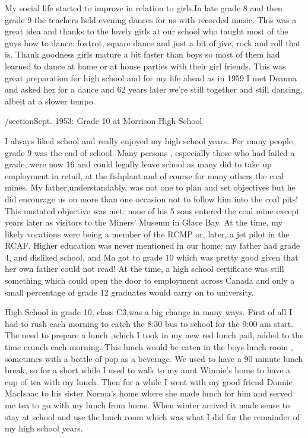 My social life started to improve in relation to girls.In late grade 8 and then grade 9 the teachers held evening dances for us with recorded music. This was a great idea and thanks to the lovely girls at our school who taught most of the guys how to dance: foxtrot, square dance and just a bit of jive, rock and roll that is. Thank goodness girls mature a bit faster than boys so most of them had learned to dance at home or at house parties with their girl friends. This was great preparation for high school and for my life ahead as in 1959 I met Deanna and asked her for a dance and 62 years later we're still together and still dancing, albeit at a slower tempo.

/section{Sept. 1953: Grade 10 at Morrison High School}

I always liked school and really enjoyed my high school years. For many people, grade 9 was the end of school. Many persons , especially those who had failed a grade, were now 16 and could legally leave school as many did to take up employment in retail, at the fishplant and of course for many others the coal mines. My father,understandably, was not one to plan and set objectives but he did encourage us on more than one occasion not to follow him into the coal pits! This unstated objective was met: none of his 5 sons entered the coal mine except years later as visitors to the Miners' Museum in Glace Bay. At the time, my likely vocations were being a member of the RCMP or, later, a jet pilot in the RCAF. Higher education was never mentioned in our home: my father had grade 4, and disliked school, and Ma got to grade 10 which was pretty good given that her own father could not read! At the time, a high school certificate was still something which could open the door to employment across Canada and only a small percentage of grade 12 graduates would carry on to university.

High School in grade 10, class C3,was a big change in many ways. First of all I had to rush each morning to catch the 8:30 bus to school for the 9:00 am start. The need to prepare a lunch ,which I took in my new red lunch pail, added to the time crunch each morning. This lunch would be eaten in the boys lunch room , sometimes with a bottle of pop as a beverage. We used to have a 90 minute lunch break, so for a short while I used to walk to my aunt Winnie's home to have a cup of tea with my lunch. Then for a while I went with my good friend Donnie MacIsaac to his sister Norma's home where she made lunch for him and served me tea to go with my lunch from home. When winter arrived it made sense to stay at school and use the lunch room which was what I did for the remainder of my high school years.

